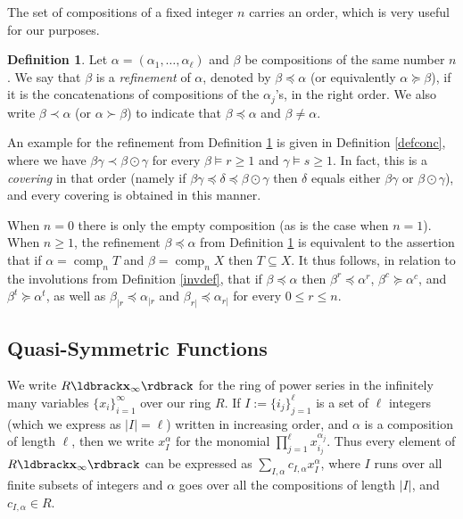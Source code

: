 \documentclass{article}
\theoremstyle{definition}
\newtheorem{defn}[thm]{Definition}
\begin{document}
\medskip

The set of compositions of a fixed integer $n$ carries an order, which is very useful for our purposes.
\begin{defn}
Let $\alpha=(\alpha_{1},\ldots,\alpha_{\ell})$ and $\beta$ be compositions of the same number $n$. We say that $\beta$ is a \emph{refinement} of $\alpha$, denoted by $\beta\preceq\alpha$ (or equivalently $\alpha\succeq\beta$), if it is the concatenations of compositions of the $\alpha_{j}$'s, in the right order. We also write $\beta\prec\alpha$ (or $\alpha\succ\beta$) to indicate that $\beta\preceq\alpha$ and $\beta\neq\alpha$. \label{refine}
\end{defn}
An example for the refinement from Definition \ref{refine} is given in Definition \ref{defconc}, where we have $\beta\gamma\prec\beta\odot\gamma$ for every $\beta \vDash r\geq1$ and $\gamma \vDash s\geq1$. In fact, this is a \emph{covering} in that order (namely if $\beta\gamma\preceq\delta\preceq\beta\odot\gamma$ then $\delta$ equals either $\beta\gamma$ or $\beta\odot\gamma$), and every covering is obtained in this manner.

When $n=0$ there is only the empty composition (as is the case when $n=1$). When $n\geq1$, the refinement $\beta\preceq\alpha$ from Definition \ref{refine} is equivalent to the assertion that if $\alpha=\operatorname{comp}_{n}T$ and $\beta=\operatorname{comp}_{n}X$ then $T \subseteq X$. It thus follows, in relation to the involutions from Definition \ref{invdef}, that if $\beta\preceq\alpha$ then $\beta^{r}\preceq\alpha^{r}$, $\beta^{c}\succeq\alpha^{c}$, and $\beta^{t}\succeq\alpha^{t}$, as well as $\beta_{|r}\preceq\alpha_{|r}$ and $\beta_{r|}\preceq\alpha_{r|}$ for every $0 \leq r \leq n$.

\subsection{Quasi-Symmetric Functions}

We write $R\ldbrack\mathbf{x}_{\infty}\rdbrack$ for the ring of power series in the infinitely many variables $\{x_{i}\}_{i=1}^{\infty}$ over our ring $R$. If $I:=\{i_{j}\}_{j=1}^{\ell}$ is a set of $\ell$ integers (which we express as $|I|=\ell$) written in increasing order, and $\alpha$ is a composition of length $\ell$, then we write $x_{I}^{\alpha}$ for the monomial $\prod_{j=1}^{\ell}x_{i_{j}}^{\alpha_{j}}$. Thus every element of $R\ldbrack\mathbf{x}_{\infty}\rdbrack$ can be expressed as $\sum_{I,\alpha}c_{I,\alpha}x_{I}^{\alpha}$, where $I$ runs over all finite subsets of integers and $\alpha$ goes over all the compositions of length $|I|$, and $c_{I,\alpha} \in R$.
\end{document}
